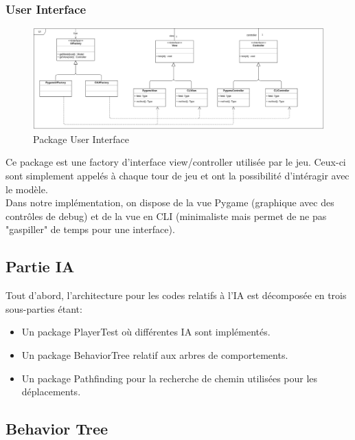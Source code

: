 \subsubsection{User Interface}

\begin{figure}[H]
    \centering
    \includegraphics[scale=0.35]{data/archi/ui.png}
    \caption{Package User Interface}
\end{figure}

Ce package est une factory d'interface view/controller utilisée par le jeu. Ceux-ci sont simplement appelés à chaque tour de jeu et ont la possibilité d'intéragir avec le modèle.\\

Dans notre implémentation, on dispose de la vue Pygame (graphique avec des contrôles de debug) et de la vue en CLI (minimaliste mais permet de ne pas "gaspiller" de temps pour une interface).

\newpage
\subsection{Partie IA}
Tout d'abord, l'architecture pour les codes relatifs à l'IA est décomposée en trois sous-parties étant:
\begin{itemize}
    \item Un package PlayerTest où différentes IA sont implémentés.
    \item Un package BehaviorTree relatif aux arbres de comportements.
    \item Un package Pathfinding pour la recherche de chemin utilisées pour les déplacements.
    \\
\end{itemize}{}

\subsection{Behavior Tree}

